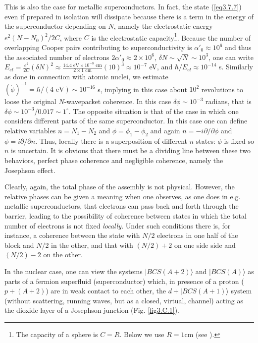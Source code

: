 This is also the case for metallic superconductors. In fact, the state (\ref{eq3.7.7}) even if prepared in isolation will dissipate because there is a term in the energy of the superconductor depending on $N$, namely the electrostatic energy $e^2(N-N_0)^2/2C$, where $C$ is the electrostatic capacity\footnote{The capacity of a sphere is $C=R$. Below we use $R=1$cm (see \cite{Anderson:64b}).}. Because the number of overlapping Cooper pairs contributing to superconductivity is $\alpha'_0\approx10^6$ and thus the associated number of electrons $2\alpha'_0\approx2\times10^6$, $\delta N\sim\sqrt{N}\sim10^3$, one can write $E_{el}=\frac{e^2}{2C}(\delta N)^2\approx\frac{14.4\text{ eV}\times10^{-8}\text{ cm}}{2\times1\text{ cm}}(10)^3\approx10^{-7}$ eV, and $\hbar/E_{el}\approx 10^{-14}$ s. Similarly as done in connection with atomic nuclei, we estimate $(\dot\phi)^{-1}=\hbar/(4\text{ eV})\sim10^{-16}$ s, implying in this case about $10^2$ revolutions to loose the original $N$-wavepacket coherence. In this case $\delta\phi\sim10^{-3}$ radians, that is $\delta\phi\sim10^{-3}/0.017\sim1^{\circ}$.   
The opposite situation is that of the case in which one considers different parts of the same superconductor. In this case one can define relative variables $n=N_1-N_2$ and $\phi=\phi_1-\phi_2$ and again $n=-i\partial/\partial \phi$ and $\phi=i\partial/\partial n$. Thus, locally there is a superposition of different $n$ states: $\phi$ is fixed so $n$ is uncertain. It is obvious that there must be a dividing line between these two behaviors, perfect phase coherence and negligible coherence, namely the Josephson effect.


Clearly, again, the total phase of the assembly is not physical. However, the relative phases can be given a meaning when one observes, as one does in e.g. metallic superconductors, that electrons can pass back and forth through the barrier, leading to the possibility of coherence between states in which the total number of electrons is not fixed \emph{locally}. Under such conditions there is, for instance, a coherence between the state with $N/2$ electrons in one half of the block and $N/2$ in the other, and that with $(N/2)+2$ on one side side and $(N/2)-2$ on the other.


In the nuclear case, one can view the systems $|BCS(A+2)\rangle$ and $|BCS(A)\rangle$ as parts of a fermion superfluid (superconductor) which, in presence of a proton ($p+(A+2)$) are in weak contact to each other, the $d+|BCS(A+1)\rangle$ system (without scattering, running waves, but as a closed, virtual, channel) acting as the dioxide layer of a Josephson junction (Fig. \ref{fig3.C.1}).





